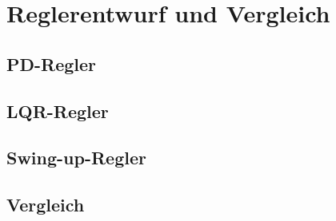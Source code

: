 \chapter{Reglerentwurf und Vergleich}
\label{ch:reglerentwurf}

\section{PD-Regler}

\section{LQR-Regler}

\section{Swing-up-Regler}

\section{Vergleich}
%
